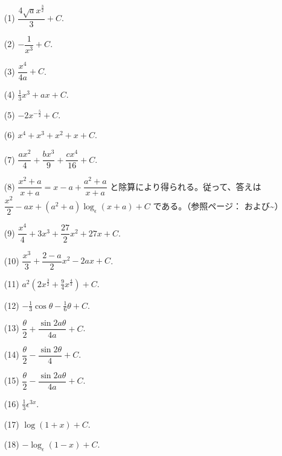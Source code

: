 \documentclass[a4paper,11pt,openany]{ltjsbook}
\begin{document}
\par\bigskip{}\par\smallskip

\begin{enumerate}
\item[(1)] \(\dfrac{4\sqrt{a} x^{\frac{3}{2}}}{3} + C\).

\item[(2)] \(-\dfrac{1}{x^3} + C\).

\item[(3)] \(\dfrac{x^4}{4a} + C\).

\item[(4)] \(\tfrac{1}{3} x^3 + ax + C\).

\item[(5)] \(-2x^{-\frac{5}{2}} + C\).

\item[(6)] \(x^4 + x^3 + x^2 + x + C\).

\item[(7)] \(\dfrac{ax^2}{4} + \dfrac{bx^3}{9} + \dfrac{cx^4}{16} + C\).

\item[(8)] \(\dfrac{x^2 + a}{x + a} = x - a + \dfrac{a^2 + a}{x + a}\) と除算により得られる。従って、答えは \(\dfrac{x^2}{2} - ax + (a^2 + a)\log_\epsilon (x + a) + C\) である。（参照ページ：\pageref{intex1} および\textasciitilde{}\pageref{intex2}）

\item[(9)] \(\dfrac{x^4}{4} + 3x^3 + \dfrac{27}{2} x^2 + 27x + C\).

\item[(10)] \(\dfrac{x^3}{3} + \dfrac{2 - a}{2} x^2 - 2ax + C\).

\item[(11)] \(a^2(2x^{\frac{3}{2}} + \tfrac{9}{4} x^{\frac{4}{3}}) + C\).

\item[(12)] \(-\tfrac{1}{3} \cos\theta - \tfrac{1}{6} \theta + C\).

\item[(13)] \(\dfrac{\theta}{2} + \dfrac{\sin 2a\theta}{4a} + C\).

\item[(14)] \(\dfrac{\theta}{2} - \dfrac{\sin 2\theta}{4} + C\).

\item[(15)] \(\dfrac{\theta}{2} - \dfrac{\sin 2a\theta}{4a} + C\).

\item[(16)] \(\tfrac{1}{3} \epsilon^{3x}\). %

\item[(17)] \(\log(1 + x) + C\).

\item[(18)] \(-\log_\epsilon (1 - x) + C\).
\par\smallskip

\end{enumerate}
\par\bigskip{}\par\smallskip
\end{document}
